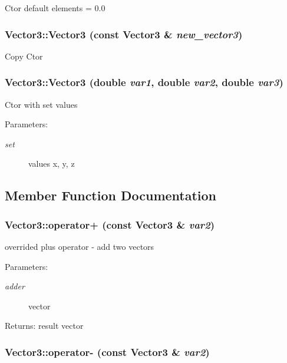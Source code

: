 Ctor default elements = 0.0 \hypertarget{class_vector3_cfdd4e4142e161c45b28359cbae52885}{
\subsubsection[Vector3]{\setlength{\rightskip}{0pt plus 5cm}Vector3::Vector3 (const {\bf Vector3} \& {\em new\_\-vector3})}}
\label{class_vector3_cfdd4e4142e161c45b28359cbae52885}


Copy Ctor \hypertarget{class_vector3_3c54fb4515e8fb241fce22a2f34f794b}{
\subsubsection[Vector3]{\setlength{\rightskip}{0pt plus 5cm}Vector3::Vector3 (double {\em var1}, \/  double {\em var2}, \/  double {\em var3})}}
\label{class_vector3_3c54fb4515e8fb241fce22a2f34f794b}


Ctor with set values \begin{Desc}
\item[Parameters:]
\begin{description}
\item[{\em set}]values x, y, z \end{description}
\end{Desc}


\subsection{Member Function Documentation}
\hypertarget{class_vector3_18adad640e9c9bccb83a5b24b6b3b404}{
\subsubsection[operator+]{ Vector3::operator+ (const {\bf Vector3} \& {\em var2})}}
\label{class_vector3_18adad640e9c9bccb83a5b24b6b3b404}


overrided plus operator - add two vectors \begin{Desc}
\item[Parameters:]
\begin{description}
\item[{\em adder}]vector \end{description}
\end{Desc}
\begin{Desc}
\item[Returns:]result vector \end{Desc}
\hypertarget{class_vector3_7b08351b25c222db113bc6a08c668e88}{
\subsubsection[operator-]{ Vector3::operator- (const {\bf Vector3} \& {\em var2})}}
\label{class_vector3_7b08351b25c222db113bc6a08c668e88}


